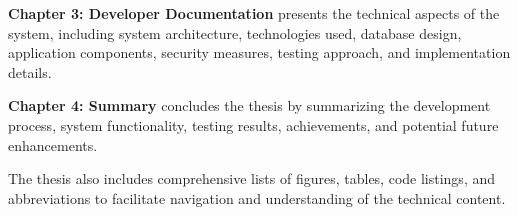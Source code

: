 \textbf{Chapter 3: Developer Documentation} presents the technical aspects of the system, including system architecture, technologies used, database design, application components, security measures, testing approach, and implementation details.

\textbf{Chapter 4: Summary} concludes the thesis by summarizing the development process, system functionality, testing results, achievements, and potential future enhancements.

The thesis also includes comprehensive lists of figures, tables, code listings, and abbreviations to facilitate navigation and understanding of the technical content.
